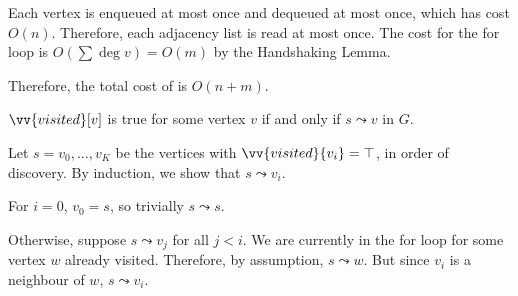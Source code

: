 Each vertex is enqueued at most once and dequeued at most once,
which has cost $O(n)$.
Therefore, each adjacency list is read at most once.
The cost for the for loop is $O(\sum \deg v) = O(m)$ by the Handshaking Lemma.

Therefore, the total cost of  is $O(n+m)$.

\begin{lemma}
  $\vv{visited}[v]$ is true for some vertex $v$
  if and only if $s \leadsto v$ in $G$.
\end{lemma}
\begin{prf}
  Let $s = v_0, \dotsc, v_K$ be the vertices with $\vv{visited}{v_i} = \top$,
  in order of discovery.
  By induction, we show that $s \leadsto v_i$.
  
  For $i = 0$, $v_0 = s$, so trivially $s \leadsto s$.

  Otherwise, suppose $s \leadsto v_j$ for all $j < i$.
  We are currently in the for loop for some vertex $w$ already visited.
  Therefore, by assumption, $s \leadsto w$.
  But since $v_i$ is a neighbour of $w$, $s \leadsto v_i$.
\end{prf}